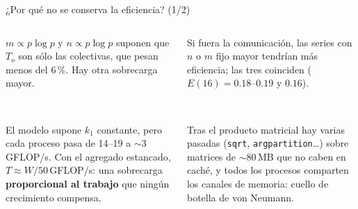 \documentclass[10pt, aspectratio=169]{beamer}
\newcommand{\cajaAlert}[2]{%
  {\setlength{\fboxsep}{6pt}%
   \colorbox{UTECAlert!8}{\begin{minipage}{\dimexpr#1-2\fboxsep\relax}#2\end{minipage}}}%
}
\newcommand{\encCaja}[1]{\textbf{\color{UTECDarkBlue}{#1}}\par\vspace{0.08cm}}
\begin{document}
\begin{frame}{¿Por qué no se conserva la eficiencia? (1/2)}
\footnotesize
\begin{columns}[T,onlytextwidth]
    \begin{column}{0.48\textwidth}
        \cajaAlert{\linewidth}{%
            \encCaja{1. La condición sólo compensa la comunicación}
            $m\propto p\log p$ y $n\propto p\log p$ suponen que $T_o$ son sólo las colectivas, que
            pesan menos del 6\,\%. Hay otra sobrecarga mayor.
        }\\[0.12cm]
        \cajaAlert{\linewidth}{%
            \encCaja{2. El cómputo se vuelve más lento}
            El modelo supone $k_1$ constante, pero cada proceso pasa de 14--19 a $\sim$3\,GFLOP/s.
            Con el agregado estancado, $T\approx W/50$\,GFLOP/s: una sobrecarga
            \textbf{proporcional al trabajo} que ningún crecimiento compensa.
        }
    \end{column}
    \begin{column}{0.48\textwidth}
        \cajaAlert{\linewidth}{%
            \encCaja{3. Prueba: el tamaño fijo no influye}
            Si fuera la comunicación, las series con $n$ o $m$ fijo mayor tendrían más eficiencia;
            las tres coinciden ($E(16)=0.18$--$0.19$ y $0.16$).
        }\\[0.12cm]
        \cajaAlert{\linewidth}{%
            \encCaja{4. Cálculo limitado por la memoria}
            Tras el producto matricial hay varias pasadas (\texttt{sqrt}, \texttt{argpartition}\ldots)
            sobre matrices de $\sim$80\,MB que no caben en caché, y todos los procesos comparten los
            canales de memoria: cuello de botella de von Neumann.
        }
    \end{column}
\end{columns}
\end{frame}
\end{document}
